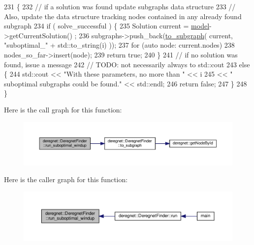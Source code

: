 \begin{DoxyCode}
231                                                                    \{
232     \textcolor{comment}{// if a solution was found update subgraphs data structure}
233     \textcolor{comment}{// Also, update the data structure tracking nodes contained in any already found subgraph}
234     \textcolor{keywordflow}{if} ( solve\_successful ) \{
235         Solution current = \hyperlink{classderegnet_1_1DeregnetFinder_ad922d8e38124b4c75daac29a928fcf5b}{model}->getCurrentSolution() ;
236         subgraphs->push\_back(\hyperlink{classderegnet_1_1DeregnetFinder_a681d5e2506f9b6075ab36e742a360328}{to\_subgraph}( current, \textcolor{stringliteral}{"suboptimal\_"} + std::to\_string(i) ));
237         \textcolor{keywordflow}{for} (\textcolor{keyword}{auto} node: current.nodes)
238             nodes\_so\_far->insert(node);
239         \textcolor{keywordflow}{return} \textcolor{keyword}{true};
240     \}
241     \textcolor{comment}{// if no solution was found, issue a message}
242     \textcolor{comment}{// TODO: not necessarily always to std::cout}
243     \textcolor{keywordflow}{else} \{
244         std::cout << \textcolor{stringliteral}{"With these parameters, no more than "} << i
245                   << \textcolor{stringliteral}{" suboptimal subgraphs could be found."} << std::endl;
246         \textcolor{keywordflow}{return} \textcolor{keyword}{false};
247     \}
248 \}
\end{DoxyCode}
Here is the call graph for this function\+:\nopagebreak
\begin{figure}[H]
\begin{center}
\leavevmode
\includegraphics[width=350pt]{classderegnet_1_1DeregnetFinder_a4021d92d787877187a24dcbaf0c1bad1_cgraph}
\end{center}
\end{figure}
Here is the caller graph for this function\+:\nopagebreak
\begin{figure}[H]
\begin{center}
\leavevmode
\includegraphics[width=350pt]{classderegnet_1_1DeregnetFinder_a4021d92d787877187a24dcbaf0c1bad1_icgraph}
\end{center}
\end{figure}
\mbox{\label{classderegnet_1_1DeregnetFinder_a681d5e2506f9b6075ab36e742a360328}} 
